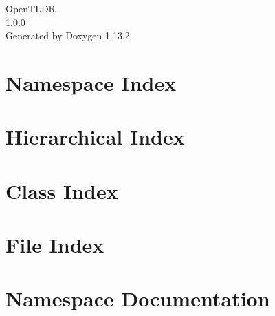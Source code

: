 \documentclass[twoside]{book}
\newcommand{\+}{\discretionary{\mbox{\scriptsize$\hookleftarrow$}}{}{}}
\newcommand{\clearemptydoublepage}{%
    \newpage{\pagestyle{empty}\cleardoublepage}%
  }
\begin{document}
  \raggedbottom
    \hypersetup{pageanchor=false,
                bookmarksnumbered=true,
                pdfencoding=unicode
               }
  \begin{titlepage}
  \vspace*{7cm}
  \begin{center}%
  {\Large Open\+TLDR}\\
  [1ex]\large 1.\+0.\+0 \\
  \vspace*{1cm}
  {\large Generated by Doxygen 1.13.2}\\
  \end{center}
  \end{titlepage}
  \clearemptydoublepage
  \tableofcontents
  \clearemptydoublepage
  \hypersetup{pageanchor=true}
\chapter{Namespace Index}

\chapter{Hierarchical Index}

\chapter{Class Index}

\chapter{File Index}

\chapter{Namespace Documentation}











\end{document}
